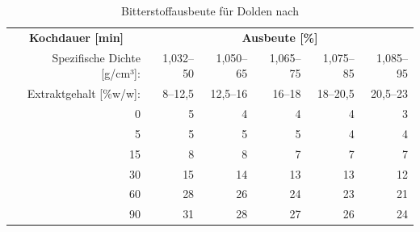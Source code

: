 \documentclass[a4paper,parskip=half]{scrartcl}
\begin{document}
\begin{table}[H]
\centering
\begin{tabular}{rrrrrr} 
\toprule
\multicolumn{1}{c}{\textbf{Kochdauer [min]}} & \multicolumn{5}{c}{\textbf{Ausbeute [\%]}}                                 \\
Spezifische Dichte [g/cm³]:                    & 1,032–50 & 1,050–65 & 1,065–75 & 1,075–85 & 1,085–95  \\
Extraktgehalt [\%w/w]:                    & 8–12,5 & 12,5–16 & 16–18 & 18–20,5 & 20,5–23  \\
\midrule                                             
0                                            & 5        & 4        & 4                            & 4                            & 3                             \\
5                                            & 5        & 5        & 5                            & 4                            & 4                             \\
15                                           & 8        & 8        & 7                            & 7                            & 7                             \\
30                                           & 15       & 14       & 13                           & 13                           & 12                            \\
60                                           & 28       & 26       & 24                           & 23                           & 21                            \\
90                                           & 31       & 28       & 27                           & 26                           & 24                            \\
\bottomrule
\end{tabular}
\caption{Bitterstoffausbeute für Dolden nach \citeauthor{Noonan1996} \parencite[215]{Noonan1996}}
\label{table:noonanbakt}
\end{table}
\end{document}
